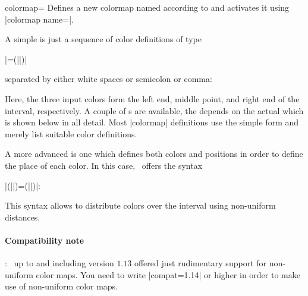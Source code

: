 \begin{pgfplotskey}{colormap=}
	Defines a new colormap named  according to  and activates it using |colormap name=|.
	
	A simple  is just a sequence of color definitions of type

	|=(||)|

	separated by either white spaces or semicolon or comma:

\begin{codeexample}
\end{codeexample}

	Here, the three input colors form the left end, middle point, and right end of the interval, respectively. A couple of s are available, the  depends on the actual  which is shown below in all detail. Most |colormap| definitions use the simple form and merely list suitable color definitions.

	A more advanced  is one which defines both colors and positions in order to define the place of each color. In this case, \PGFPlots\ offers the syntax

	|(||)=(||)|:

\begin{codeexample}
\end{codeexample}
	
	This syntax allows to distribute colors over the interval using non-uniform distances. 
	
	\paragraph{Compatibility note}: \PGFPlots\ up to and including version $1.13$ offered just rudimentary support for non-uniform color maps. You need to write |compat=1.14| or higher in order to make use of non-uniform color maps.
	

\end{pgfplotskey}
